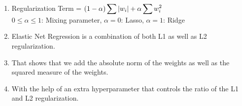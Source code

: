\begin{enumerate}
    \item Regularization Term = $ (1-\alpha) \displaystyle\sum \left| w_i \right| + \alpha\displaystyle\sum w_i^2$
    \hfill \cite{geeksforgeeks/machine-learning/regularization-in-machine-learning}
    \\
    $0 \leq \alpha \leq 1$: Mixing parameter, $\alpha=0$: Lasso, $\alpha=1$: Ridge

    \item Elastic Net Regression is a combination of both L1 as well as L2 regularization.
    \hfill \cite{geeksforgeeks/machine-learning/regularization-in-machine-learning}

    \item That shows that we add the absolute norm of the weights as well as the squared measure of the weights.
    \hfill \cite{geeksforgeeks/machine-learning/regularization-in-machine-learning}

    \item With the help of an extra hyperparameter that controls the ratio of the L1 and L2 regularization.
    \hfill \cite{geeksforgeeks/machine-learning/regularization-in-machine-learning}
\end{enumerate}
























